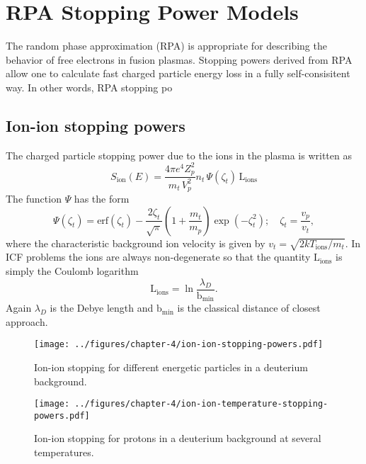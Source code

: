 \section{RPA Stopping Power Models}
The random phase approximation (RPA) is appropriate for describing the behavior of free electrons in fusion plasmas. Stopping powers derived from RPA allow one to calculate fast charged particle energy loss in a fully self-consisitent way. In other words, RPA stopping po

\subsection{Ion-ion stopping powers}
The charged particle stopping power due to the ions in the plasma is written as
\begin{equation}
  S_{\text{ion}}(E) = \dfrac{4 \pi e^4 Z_p^2}{m_t \, V_p^2} n_t \, \Psi(\zeta_t) \, \text{L}_{\text{ions}}
\end{equation}
The function $\Psi$ has the form
\begin{equation}
  \Psi(\zeta_t) = \text{erf}(\zeta_t) - \dfrac{2 \zeta_t}{\sqrt{\pi}}\left(1 + \dfrac{m_t}{m_p} \right) \exp\left(-\zeta_t^2\right); \quad \zeta_t = \dfrac{v_p}{v_t},
\end{equation}
where the characteristic background ion velocity is given by $v_t = \sqrt{2kT_{\text{ions}}/m_t}$. In ICF problems the ions are always non-degenerate so that the quantity $\text{L}_{\text{ions}}$ is simply the Coulomb logarithm
\begin{equation}
  \text{L}_{\text{ions}} = \ln \dfrac{\lambda_D}{\text{b}_{\text{min}}}.
\end{equation}
Again $\lambda_D$ is the Debye length and $\text{b}_{\text{min}}$ is the classical distance of closest approach.

\begin{figure}[!htb]
  \centering
  \begin{minipage}[b]{0.45\textwidth}
    \texttt{[image: ../figures/chapter-4/ion-ion-stopping-powers.pdf]}
    \caption{Ion-ion stopping for different energetic particles in a deuterium background.}
  \end{minipage}
  \hfill
  \begin{minipage}[b]{0.45\textwidth}
    \texttt{[image: ../figures/chapter-4/ion-ion-temperature-stopping-powers.pdf]}
    \caption{Ion-ion stopping for protons in a deuterium background at several temperatures.}
  \end{minipage}
\end{figure}

